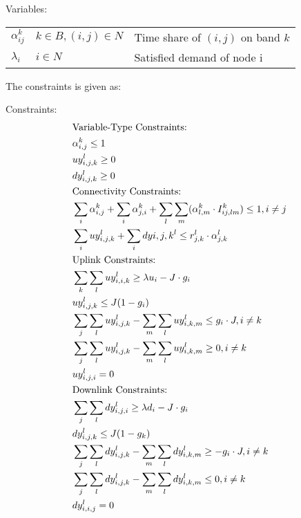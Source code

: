 \vspace{2pt}
Variables:
\vspace{1pt}
\begin{tabular}{lll}
$\alpha_{ij}^k$ & $k\in B, (i,j) \in N$ & 
Time share of $(i,j)$ on band $k$\\ 
$\lambda_{i}$ & $i \in N$ & 
Satisfied demand of node i\\ 
\end{tabular}

\vspace{3pt}
The constraints is given as:

\vspace{1pt}


Constraints:
\begin{align}
& \text{Variable-Type Constraints:}\notag \\
& \alpha _{i,j}^k \leq 1 \\
& uy_{i,j,k}^l \geq 0 \\
& dy_{i,j,k}^l \geq 0 \\
& \text{Connectivity Constraints:} \notag \\
\label{opt:1}
& \sum_i \alpha_{i,j}^k + \sum_i \alpha_{j,i}^k + \sum_l\sum_m(\alpha_{l,m}^k \cdot I_{ij,lm}^k) \leq 1, i\neq j \\
\label{opt:2}
& \sum_i uy_{i,j,k}^l + \sum_i dy{i,j,k}^l \leq r_{j,k}^l \cdot \alpha_{j,k}^l \\
& \text{Uplink Constraints:}\notag \\
\label{opt:3}
& \sum_k \sum_l uy_{i,i,k}^l \geq \lambda u_i - J\cdot g_i \\
\label{opt:4}
& uy_{i,j,k}^l \leq J(1-g_i) \\
\label{opt:5}
& \sum_j\sum_l uy_{i,j,k}^l - \sum_m\sum_l uy_{i,k,m}^l \leq g_i \cdot J , i \neq k\\
\label{opt:6}
& \sum_j\sum_l uy_{i,j,k}^l - \sum_m \sum_l uy_{i,k,m}^l \geq 0, i \neq k\\
\label{opt:7}
& uy_{i,j,i}^l=0\\
& \text{Downlink Constraints:}\notag \\
\label{opt:8}
& \sum_j \sum_l dy_{i,j,i}^l \geq \lambda d_i - J\cdot g_i \\
\label{opt:9}
& dy_{i,j,k}^l \leq J(1-g_k) \\
\label{opt:10}
& \sum_j\sum_l dy_{i,j,k}^l - \sum_m\sum_l dy_{i,k,m}^l \geq -g_i \cdot J, i \neq k\\
\label{opt:11}
& \sum_j\sum_l dy_{i,j,k}^l - \sum_m \sum_l dy_{i,k,m}^l \leq 0, i \neq k\\
\label{opt:12}
& dy_{i,i,j}^l=0
\end{align}

